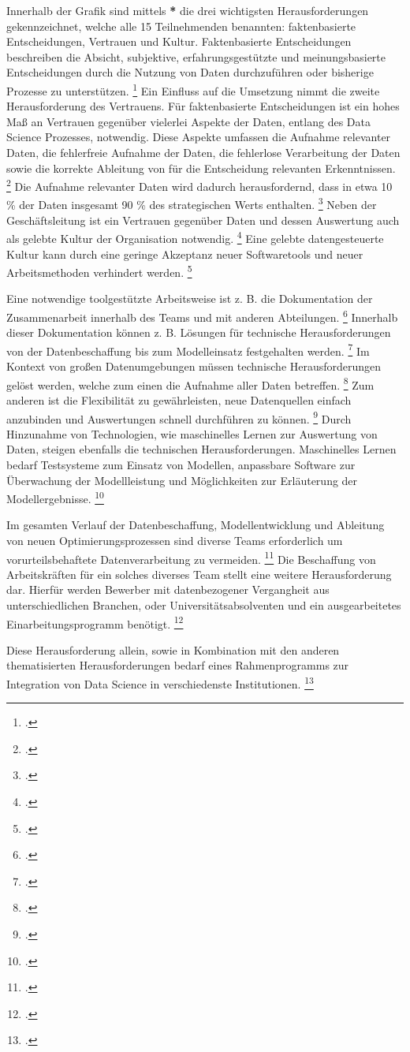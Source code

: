 Innerhalb der Grafik sind mittels \textbf{*} die drei wichtigsten Herausforderungen gekennzeichnet, welche alle 15 Teilnehmenden benannten: faktenbasierte Entscheidungen, Vertrauen und Kultur.
Faktenbasierte Entscheidungen beschreiben die Absicht, subjektive, erfahrungsgestützte und meinungsbasierte Entscheidungen durch die Nutzung von Daten durchzuführen oder bisherige Prozesse zu unterstützen. \footcite[Vgl.][S. 9]{Dalpiaz.2020}
Ein Einfluss auf die Umsetzung nimmt die zweite Herausforderung des Vertrauens.
Für faktenbasierte Entscheidungen ist ein hohes Maß an Vertrauen gegenüber vielerlei Aspekte der Daten, entlang des Data Science Prozesses, notwendig.
Diese Aspekte umfassen die Aufnahme relevanter Daten, die fehlerfreie Aufnahme der Daten, die fehlerlose Verarbeitung der Daten sowie die korrekte Ableitung von für die Entscheidung relevanten Erkenntnissen. \footcite[Vgl.][S. 10]{Dalpiaz.2020}
Die Aufnahme relevanter Daten wird dadurch herausfordernd, dass in etwa 10 \% der Daten insgesamt 90 \% des strategischen Werts enthalten. \footcite[Vgl.][S. 3]{Pratt.2023}
Neben der Geschäftsleitung ist ein Vertrauen gegenüber Daten und dessen Auswertung auch als gelebte Kultur der Organisation notwendig. \footcite[Vgl.][S. 4]{Dalpiaz.2020}
Eine gelebte datengesteuerte Kultur kann durch eine geringe Akzeptanz neuer Softwaretools und neuer Arbeitsmethoden verhindert werden. \footcite[Vgl.][S. 15]{Dalpiaz.2020}

Eine notwendige toolgestützte Arbeitsweise ist z. B. die Dokumentation der Zusammenarbeit innerhalb des Teams und mit anderen Abteilungen. \footcite[Vgl.][S. 12]{Zhang.2020b}
Innerhalb dieser Dokumentation können z. B. Lösungen für technische Herausforderungen von der Datenbeschaffung bis zum Modelleinsatz festgehalten werden. \footcite[Vgl.][S. 23]{Grossman.2014}
Im Kontext von großen Datenumgebungen müssen technische Herausforderungen gelöst werden, welche zum einen die Aufnahme aller Daten betreffen. \footcite[Vgl.][S. 217]{Elgendy.2014}
Zum anderen ist die Flexibilität zu gewährleisten, neue Datenquellen einfach anzubinden und Auswertungen schnell durchführen zu können. \footcite[Vgl.][S. 217]{Elgendy.2014}
Durch Hinzunahme von Technologien, wie maschinelles Lernen zur Auswertung von Daten, steigen ebenfalls die technischen Herausforderungen.
Maschinelles Lernen bedarf Testsysteme zum Einsatz von Modellen, anpassbare Software zur Überwachung der Modellleistung und Möglichkeiten zur Erläuterung der Modellergebnisse. \footcite[Vgl.][S. 1]{Nahar.2022}

Im gesamten Verlauf der Datenbeschaffung, Modellentwicklung und Ableitung von neuen Optimierungsprozessen sind diverse Teams erforderlich um vorurteilsbehaftete Datenverarbeitung zu vermeiden. \footcite[Vgl.][S. 18]{Zhang.2020b}
Die Beschaffung von Arbeitskräften für ein solches diverses Team stellt eine weitere Herausforderung dar. 
Hierfür werden Bewerber mit datenbezogener Vergangheit aus unterschiedlichen Branchen, oder Universitätsabsolventen und ein ausgearbeitetes Einarbeitungsprogramm benötigt. \footcite[Vgl.][S. 13]{Patil.2011}

Diese Herausforderung allein, sowie in Kombination mit den anderen thematisierten Herausforderungen bedarf eines Rahmenprogramms zur Integration von Data Science in verschiedenste Institutionen. \footcite[Vgl.][S. 1]{Saltz.2017}
